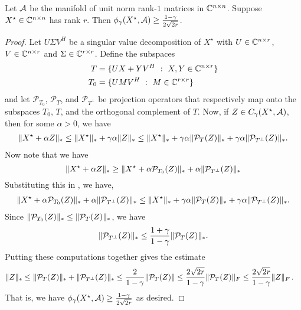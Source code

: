 \begin{prop}
Let $\mathcal{A}$ be the manifold of unit norm rank-$1$ matrices in $\mathbb{C}^{n\times n}$. Suppose $X^\star \in \mathbb{C}^{n\times n}$ has rank $r$.  Then $\phi_\gamma(X^\star,\mathcal{A}) \geq \frac{1-\gamma}{2\sqrt{2r}}$. 
\end{prop}

\begin{proof}
Let $U \Sigma V^H$ be a singular value decomposition of $X^\star$ with $U \in \mathbb{C}^{n \times r}$, $V \in \mathbb{C}^{n \times r}$ and $\Sigma \in \mathbb{C}^{r \times r}$. Define the subspaces 
\begin{align*}
T &= \{U X + Y V^H ~:~ X, Y \in \mathbb{C}^{n \times r} \}\\
T_0 &= \{U M V^H ~:~ M \in \mathbb{C}^{r \times r} \}
\end{align*}
and let $\mathcal{P}_{T_0}$, $\mathcal{P}_{T}$, and $\mathcal{P}_{T^\perp}$ be projection operators that respectively map onto the subspaces $T_0$, $T$, and the orthogonal complement of $T$. Now, if $Z \in C_\gamma(X^\star, \mathcal{A})$, then for some $\alpha > 0$,  we have
\begin{align}
\label{eq:cone_matrix}
\lVert X^\star + \alpha Z\rVert_* \leq 
\lVert X^\star\rVert_* + \gamma \alpha \lVert Z\rVert_*
\leq \lVert X^\star\rVert_* + \gamma \alpha \lVert\mathcal{P}_T (Z)\rVert_* +  \gamma \alpha \lVert\mathcal{P}_{T^\perp} (Z)\rVert_*.
\end{align}
Now note that we have
\[
\lVert X^\star + \alpha Z\rVert_* \geq \lVert X^\star + \alpha\mathcal{P}_{T_0} (Z)\rVert_* + \alpha\lVert\mathcal{P}_{T^\perp} (Z)\rVert_*
\]
Substituting this in , we have,
\begin{align*}
\lVert X^\star + \alpha\mathcal{P}_{T_0} (Z)\rVert_* + \alpha\lVert\mathcal{P}_{T^\perp} (Z)\rVert_* 
\leq \lVert X^\star\rVert_* + \gamma \alpha \lVert\mathcal{P}_T (Z)\rVert_* +  \gamma \alpha \lVert\mathcal{P}_{T^\perp} (Z)\rVert_*.
\end{align*}
Since $\lVert\mathcal{P}_{T_0} (Z)\rVert_* \leq \lVert\mathcal{P}_T (Z)\rVert_*$, we have 
\[
\lVert\mathcal{P}_{T^\perp} (Z)\rVert_* \leq \frac{1+\gamma}{1-\gamma}\lVert\mathcal{P}_T(Z)\rVert_*.
\]
Putting these computations together gives the estimate
\begin{align*}
\lVert Z\rVert_* &\leq \lVert\mathcal{P}_T(Z)\rVert_* + \lVert\mathcal{P}_{T^\perp}(Z)\rVert_* \leq \frac{2}{1-\gamma}\lVert\mathcal{P}_T(Z)\rVert
 \leq \frac{2\sqrt{2r}}{1-\gamma}\lVert\mathcal{P}_T(Z)\rVert_F
 \leq \frac{2\sqrt{2r}}{1-\gamma}\lVert Z\rVert_F\,.
\end{align*}
That is, we have $\phi_\gamma(X^\star,\mathcal{A}) \geq \frac{1-\gamma}{2\sqrt{2r}}$ as desired.
\end{proof} 


